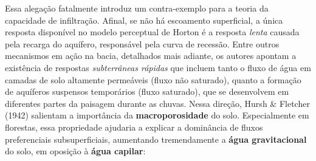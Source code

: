 \documentclass[./main.tex]{subfiles}
\begin{document}
\noindent Essa alegação fatalmente introduz um contra-exemplo para a teoria da capacidade de infiltração. Afinal, se não há escoamento superficial, a única resposta disponível no modelo perceptual de Horton é a resposta \textit{lenta} causada pela recarga do aquífero, responsável pela curva de recessão. Entre outros mecanismos em ação na bacia, detalhados mais adiante, os autores apontam a existência de respostas \textit{subterrâneas rápidas} que incluem tanto o fluxo de água em camadas de solo altamente permeáveis (fluxo não saturado), quanto a formação de aquíferos suspensos temporários (fluxo saturado), que se desenvolvem em diferentes partes da paisagem durante as chuvas. Nessa direção, Hursh \& Fletcher (1942) \cite{Hursh1942} salientam a importância da \textbf{macroporosidade} do solo. Especialmente em florestas, essa propriedade ajudaria a explicar a dominância de fluxos preferenciais subsuperficiais, aumentando tremendamente a \textbf{água gravitacional} do solo, em oposição à \textbf{água capilar}:
\end{document}
